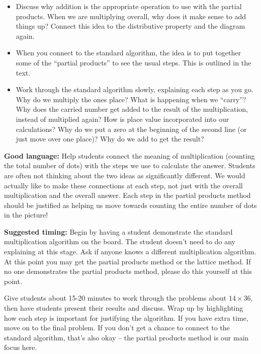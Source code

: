 \documentclass[nooutcomes,noauthor]{ximera}
\begin{document}
\begin{instructorNotes}
\begin{itemize}
	\item Discuss why addition is the appropriate operation to use with the partial products. When we are multiplying overall, why does it make sense to add things up? Connect this idea to the distributive property and the diagram again.
	\item When you connect to the standard algorithm, the idea is to put together some of the ``partial products'' to see the usual steps. This is outlined in the text.
	\item Work through the standard algorithm slowly, explaining each step as you go. Why do we multiply the ones place? What is happening when we ``carry''? Why does the carried number get added to the result of the multiplication, instead of multiplied again? How is place value incorporated into our calculations? Why do we put a zero at the beginning of the second line (or just move over one place)? Why do we add to get the result?
\end{itemize}


{\bf Good language:}  Help students connect the meaning of multiplication (counting the total number of dots) with the steps we use to calculate the answer. Students are often not thinking about the two ideas as significantly different. We would actually like to make these connections at each step, not just with the overall multiplication and the overall answer. Each step in the partial products method should be justified as helping us move towards counting the entire number of dots in the picture!


{\bf Suggested timing:} Begin by having a student demonstrate the standard multiplication algorithm on the board. The student doesn't need to do any explaining at this stage. Ask if anyone knows a different multiplication algorithm. At this point you may get the partial products method or the lattice method. If no one demonstrates the partial products method, please do this yourself at this point.

Give students about 15-20 minutes to work through the problems about $14 \times 36$, then have students present their results and discuss. Wrap up by highlighting how each step is important for justifying the algorithm. If you have extra time, move on to the final problem. If you don't get a chance to connect to the standard algorithm, that's also okay -- the partial products method is our main focus here.




\end{instructorNotes}
\end{document}
